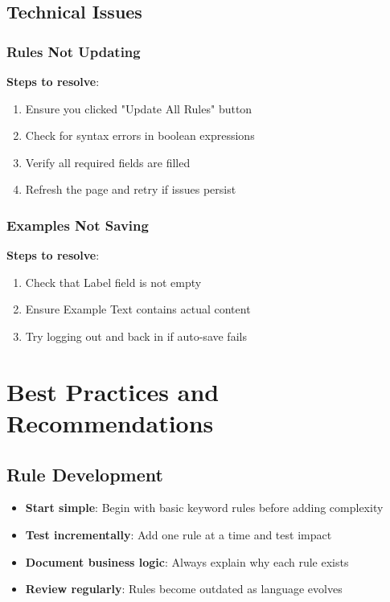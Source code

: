 \documentclass[11pt,a4paper]{article}
\begin{document}
\subsection{Technical Issues}

\subsubsection{Rules Not Updating}
\textbf{Steps to resolve}:
\begin{enumerate}
    \item Ensure you clicked "Update All Rules" button
    \item Check for syntax errors in boolean expressions
    \item Verify all required fields are filled
    \item Refresh the page and retry if issues persist
\end{enumerate}

\subsubsection{Examples Not Saving}
\textbf{Steps to resolve}:
\begin{enumerate}
    \item Check that Label field is not empty
    \item Ensure Example Text contains actual content
    \item Try logging out and back in if auto-save fails
\end{enumerate}

\section{Best Practices and Recommendations}

\subsection{Rule Development}
\begin{itemize}
    \item \textbf{Start simple}: Begin with basic keyword rules before adding complexity
    \item \textbf{Test incrementally}: Add one rule at a time and test impact
    \item \textbf{Document business logic}: Always explain why each rule exists
    \item \textbf{Review regularly}: Rules become outdated as language evolves
\end{itemize}
\end{document}
